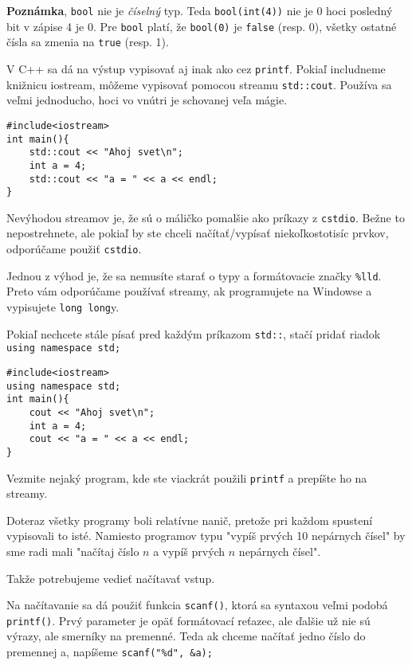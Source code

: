 \textbf{Poznámka}, \verb!bool! nie je \textit{číselný} typ. Teda \verb!bool(int(4))! nie
je 0 hoci posledný bit v zápise 4 je 0.  Pre \verb!bool! platí, že
\verb!bool(0)! je \verb!false! (resp. 0), všetky ostatné čísla sa zmenia na
\verb!true! (resp. 1).


V C++ sa dá na výstup vypisovať aj inak ako cez \verb!printf!. Pokiaľ
includneme knižnicu iostream, môžeme vypisovať pomocou streamu
\verb!std::cout!. Používa sa veľmi jednoducho, hoci vo vnútri je schovanej veľa
mágie.

\begin{lstlisting}
#include<iostream>
int main(){
    std::cout << "Ahoj svet\n";
    int a = 4;
    std::cout << "a = " << a << endl;
}
\end{lstlisting}

Nevýhodou streamov je, že sú o máličko pomalšie ako príkazy z \verb!cstdio!. Bežne
to nepostrehnete, ale pokiaľ by ste chceli načítať/vypísať niekoľkostotisíc
prvkov, odporúčame použiť \verb!cstdio!.

Jednou z výhod je, že sa nemusíte starať o typy a formátovacie značky
\verb"%lld". Preto vám odporúčame používať streamy, ak programujete na Windowse
a vypisujete \verb!long long!y.

Pokiaľ nechcete stále písať pred každým príkazom \verb!std::!, stačí pridať
riadok \verb!using namespace std;!

\begin{lstlisting}
#include<iostream>
using namespace std;
int main(){
    cout << "Ahoj svet\n";
    int a = 4;
    cout << "a = " << a << endl;
}
\end{lstlisting}

\cvicenie Vezmite nejaký program, kde ste viackrát použili \verb!printf! a
prepíšte ho na streamy.
\fakeriesenie


Doteraz všetky programy boli relatívne nanič, pretože pri každom spustení
vypisovali to isté.  Namiesto programov typu "vypíš prvých 10 nepárnych čísel"
by sme radi mali "načítaj číslo $n$ a vypíš prvých $n$ nepárnych čísel".

Takže potrebujeme vedieť načítavať vstup.

Na načítavanie sa dá použiť funkcia \verb!scanf()!, ktorá sa syntaxou veľmi
podobá \verb!printf()!. Prvý parameter je opäť formátovací reťazec, ale ďalšie
už nie sú výrazy, ale smerníky na premenné. Teda ak chceme načítať jedno číslo
do premennej a, napíšeme \verb!scanf("%d", &a);!

